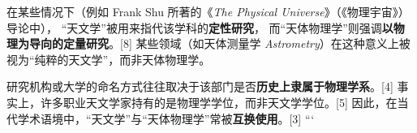 在某些情况下（例如 Frank Shu 所著的《\textit{The Physical Universe}》（《物理宇宙》）导论中），  
“天文学”被用来指代该学科的\textbf{定性研究}，  
而“天体物理学”则强调\textbf{以物理为导向的定量研究}。[8]  
某些领域（如天体测量学 \textit{Astrometry}）在这种意义上被视为“纯粹的天文学”，而非天体物理学。

研究机构或大学的命名方式往往取决于该部门是否\textbf{历史上隶属于物理学系}。[4]  
事实上，许多职业天文学家持有的是物理学学位，而非天文学学位。[5]  
因此，在当代学术语境中，“天文学”与“天体物理学”常被\textbf{互换使用}。[3]
```

